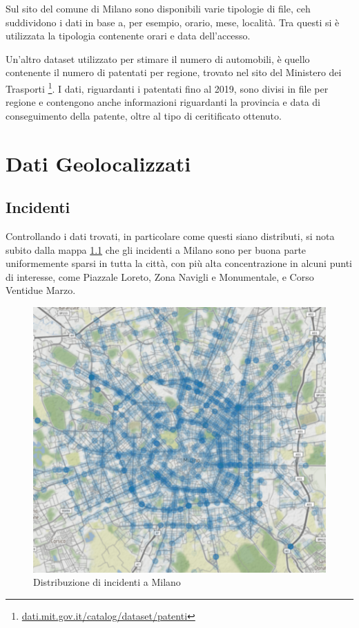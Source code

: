 \documentclass[a4paper]{report}
\begin{document}
Sul sito del comune di Milano sono disponibili varie tipologie di file, 
ceh suddividono i dati in base a, per esempio, orario, mese, località. 
Tra questi si è utilizzata la tipologia contenente orari e data dell'accesso.

Un'altro dataset utilizzato per stimare il numero di automobili, è quello contenente il numero di 
patentati per regione, trovato nel sito del Ministero dei Trasporti
\footnote{\url{dati.mit.gov.it/catalog/dataset/patenti}}.
I dati, riguardanti i patentati fino al 2019, sono divisi in file per regione e contengono anche 
informazioni riguardanti la provincia e data di conseguimento della patente, 
oltre al tipo di ceritificato ottenuto.


\chapter{Dati Geolocalizzati}

\section{Incidenti}

Controllando i dati trovati, in particolare come questi siano distributi, 
si nota subito dalla mappa \ref{fig:geo-incidenti} che gli incidenti a Milano sono per buona parte uniformemente sparsi in tutta la città, 
con più alta concentrazione in alcuni punti di interesse, come Piazzale Loreto, Zona Navigli 
e Monumentale, e Corso Ventidue Marzo.

\begin{figure}
    \includegraphics[width=\linewidth]{../src/incidenti/geo_incidenti.png}
    \caption{Distribuzione di incidenti a Milano}
    \label{fig:geo-incidenti}
\end{figure}
\end{document}
